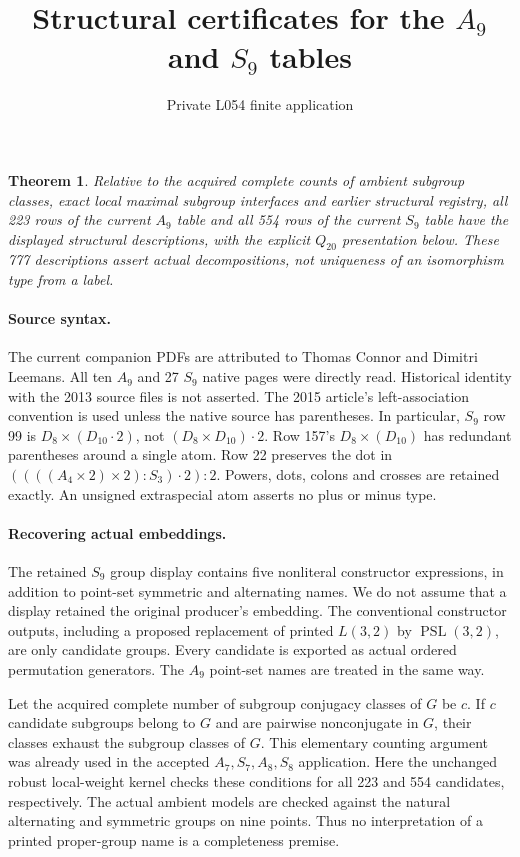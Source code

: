 \documentclass[11pt]{article}
\title{Structural certificates for the $A_9$ and $S_9$ tables}
\author{Private L054 finite application}\date{}
\newtheorem{theorem}{Theorem}
\begin{document}
\maketitle
\begin{theorem}
Relative to the acquired complete counts of ambient subgroup classes,
exact local maximal subgroup interfaces and earlier structural registry,
all 223 rows of the current $A_9$ table and all 554 rows of the current
$S_9$ table have the displayed structural descriptions, with the explicit
$Q_{20}$ presentation below. These 777 descriptions assert actual
decompositions, not uniqueness of an isomorphism type from a label.
\end{theorem}

\paragraph{Source syntax.}
The current companion PDFs are attributed to Thomas Connor and Dimitri
Leemans. All ten $A_9$ and 27 $S_9$ native pages were directly read.
Historical identity with the 2013 source files is not asserted.
The 2015 article's left-association convention is used unless the native
source has parentheses. In particular, $S_9$ row 99 is
$D_8\times(D_{10}\mathbin{\cdot}2)$, not
$(D_8\times D_{10})\mathbin{\cdot}2$. Row 157's $D_8\times(D_{10})$
has redundant parentheses around a single atom. Row 22 preserves the dot
in $((((A_4\times2)\times2):S_3)\mathbin{\cdot}2):2$.
Powers, dots, colons and crosses are retained exactly. An unsigned
extraspecial atom asserts no plus or minus type.

\paragraph{Recovering actual embeddings.}
The retained $S_9$ group display contains five nonliteral constructor
expressions, in addition to point-set symmetric and alternating names.
We do not assume that a display retained the original producer's embedding.
The conventional constructor outputs, including a proposed replacement
of printed $L(3,2)$ by $\operatorname{PSL}(3,2)$, are only candidate groups.
Every candidate is exported as actual ordered permutation generators.
The $A_9$ point-set names are treated in the same way.

Let the acquired complete number of subgroup conjugacy classes of $G$
be $c$. If $c$ candidate subgroups belong to $G$ and are pairwise
nonconjugate in $G$, their classes exhaust the subgroup classes of $G$.
This elementary counting argument was already used in the accepted
$A_7,S_7,A_8,S_8$ application. Here the unchanged robust local-weight
kernel checks these conditions for all 223 and 554 candidates, respectively.
The actual ambient models are checked against the natural alternating
and symmetric groups on nine points. Thus no interpretation of a printed
proper-group name is a completeness premise.
\end{document}
